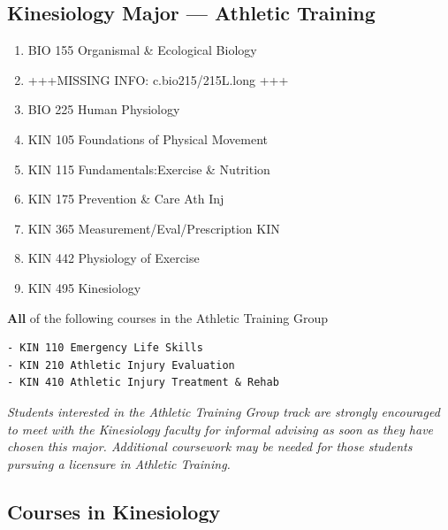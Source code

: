 \documentclass[
  letterpaper,
]{scrbook}
\providecommand{\tightlist}{%
  \setlength{\itemsep}{0pt}\setlength{\parskip}{0pt}}
\begin{document}
\subsection{Kinesiology Major --- Athletic
Training}\label{kinesiology-major-athletic-training}

\begin{enumerate}
\def\labelenumi{\arabic{enumi}.}
\tightlist
\item
  BIO 155 Organismal \& Ecological Biology
\item
  +++MISSING INFO: c.bio215/215L.long +++
\item
  BIO 225 Human Physiology
\item
  KIN 105 Foundations of Physical Movement
\item
  KIN 115 Fundamentals:Exercise \& Nutrition
\item
  KIN 175 Prevention \& Care Ath Inj
\item
  KIN 365 Measurement/Eval/Prescription KIN
\item
  KIN 442 Physiology of Exercise
\item
  KIN 495 Kinesiology
\end{enumerate}

\textbf{All} of the following courses in the Athletic Training Group

\begin{verbatim}
- KIN 110 Emergency Life Skills
- KIN 210 Athletic Injury Evaluation
- KIN 410 Athletic Injury Treatment & Rehab
\end{verbatim}

\emph{Students interested in the Athletic Training Group track are
strongly encouraged to meet with the Kinesiology faculty for informal
advising as soon as they have chosen this major. Additional coursework
may be needed for those students pursuing a licensure in Athletic
Training. }

\subsection{Courses in Kinesiology}\label{courses-in-kinesiology}
\end{document}
